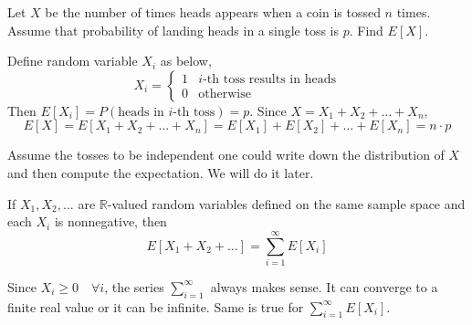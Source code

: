 \begin{example}
    Let $X$ be the number of times heads appears when a coin is tossed $n$
times. Assume that probability of landing heads in a single toss is $p$. Find
$E[X]$.
\end{example}
\begin{solution}
    Define random variable $X_i$ as below,
    \begin{equation*}
        X_i = \begin{cases}
            1   & i\text{-th toss results in heads}                          \\
            0   & \text{otherwise}
        \end{cases}
    \end{equation*}
    Then $E[X_i] = P(\text{heads in }i\text{-th toss}) = p$. Since $X = X_1 +
X_2 + \dots + X_n$,
    \begin{equation*}
        E[X] = E[X_1 + X_2 + \dots + X_n]
             = E[X_1] + E[X_2] + \dots + E[X_n]
             = n \cdot p
    \end{equation*}
\end{solution}
\note Assume the tosses to be independent one could write down the
distribution of $X$ and then compute the expectation. We will do it later.

\begin{theorem}
    If $X_1, X_2, \dots$ are $\mathbb{R}$-valued random variables defined on
the same sample space and each $X_i$ is nonnegative, then
    \begin{equation*}
        E[X_1 + X_2 + \dots] = \sum_{i = 1}^\infty E[X_i]
    \end{equation*}
\end{theorem}
\note Since $X_i \geq 0 \quad \forall i$, the series $\sum_{i = 1}^\infty$
always makes sense. It can converge to a finite real value or it can be
infinite. Same is true for $\sum_{i = 1}^\infty E[X_i]$.